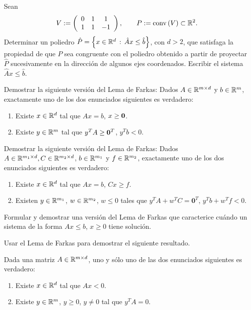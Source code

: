 \documentclass[a4paper,12pt]{article}
\renewcommand{\conv}[1]{\mathrm{conv}\left(#1\right)}
\begin{document}
\begin{exerciselist}
  \item Sean
  $$
  V:= \left(
  \begin{array}{ccc}
  0 & 1 & 1 \\
  1 & 1 & -1
  \end{array}
  \right), \qquad
  P:= \conv{V} \subset \RR^2.
  $$
  Determinar un poliedro $\hat{P}=\left\{ x \in \mathbb{R}^d \, : \, \hat{A}x \leq \hat{b} \right\}$,
  con $d>2$, que satisfaga la propiedad de que $P$ sea congruente con el
  poliedro obtenido a partir de proyectar $\hat{P}$ sucesivamente en la
  dirección de algunos ejes coordenados. Escribir el sistema $\hat{A}x \leq
  \hat{b}$.

  \item Demostrar la siguiente versión del Lema de Farkas: Dados $A \in \mathbb{R}^{m \times d}$ y $b \in \mathbb{R}^m$,
  exactamente uno de los dos enunciados siguientes es verdadero:
  \begin{enumerate}
  \item Existe $x \in \mathbb{R}^d$ tal que $Ax=b$, $x \geq \mathord{\bf 0}$.
  \item Existe $y \in \mathbb{R}^m$ tal que
  $y^TA \geq \mathord{\bf 0}^T$, $y^Tb < 0$.
  \end{enumerate}

  \item Demostrar la siguiente versión del Lema de Farkas: Dados $A \in \mathbb{R}^{m_1
  \times d}, C \in \mathbb{R}^{m_2 \times d}$, $b \in \mathbb{R}^{m_1}$ y $f \in \mathbb{R}^{m_2}$,
  exactamente uno de los dos enunciados siguientes es verdadero:
  \begin{enumerate}
  \item Existe $x \in \mathbb{R}^d$ tal que $Ax=b$, $Cx \geq f$.
  \item Existen $y \in \mathbb{R}^{m_1}$, $w \in \mathbb{R}^{m_2}$, $w \leq 0$ tales que
  $y^TA + w^TC = \mathbf{0}^T$, $y^Tb + w^Tf < 0$.
  \end{enumerate}

  \item Formular y demostrar una versión del Lema de Farkas que caracterice
  cuándo un sistema de la forma $Ax \leq b$, $x \geq 0$ tiene solución.

  \item Usar el Lema de Farkas para demostrar el siguiente resultado.

  Dada una matriz $A \in \mathbb{R}^{m \times d}$, uno y sólo uno de las dos enunciados siguientes es verdadero:
  \begin{enumerate}
  \item Existe $x \in \mathbb{R}^d$ tal que $Ax < 0$.
  \item Existe $y \in \mathbb{R}^m$, $y \geq 0$, $y \neq 0$ tal que $y^T A = 0$.
  \end{enumerate}


\end{exerciselist}
\end{document}

